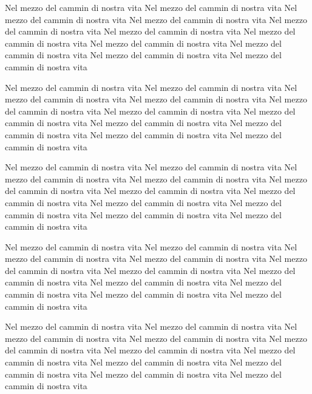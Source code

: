 \documentclass[11pt,a4paper,twoside]{book}
\begin{document}
\beginnumbering
\numberpstarttrue
{}
\pstart\label{1}%
%
%
%
Nel mezzo del cammin di nostra vita Nel mezzo del cammin di nostra vita Nel mezzo del cammin di nostra vita Nel mezzo del cammin di nostra vita Nel mezzo del cammin di nostra vita Nel mezzo del cammin di nostra vita Nel mezzo del cammin di nostra vita Nel mezzo del cammin di nostra vita Nel mezzo del cammin di nostra vita Nel mezzo del cammin di nostra vita Nel mezzo del cammin di nostra vita 
\pend

\pstart\label{2}%
%
%
Nel mezzo del cammin di nostra vita Nel mezzo del cammin di nostra vita Nel mezzo del cammin di nostra vita Nel mezzo del cammin di nostra vita Nel mezzo del cammin di nostra vita Nel mezzo del cammin di nostra vita Nel mezzo del cammin di nostra vita Nel mezzo del cammin di nostra vita Nel mezzo del cammin di nostra vita Nel mezzo del cammin di nostra vita Nel mezzo del cammin di nostra vita 
\pend

\pstart\label{3}%
%
%
Nel mezzo del cammin di nostra vita Nel mezzo del cammin di nostra vita Nel mezzo del cammin di nostra vita Nel mezzo del cammin di nostra vita Nel mezzo del cammin di nostra vita Nel mezzo del cammin di nostra vita Nel mezzo del cammin di nostra vita Nel mezzo del cammin di nostra vita Nel mezzo del cammin di nostra vita Nel mezzo del cammin di nostra vita Nel mezzo del cammin di nostra vita 
\pend

\pstart\label{4}%
%
%
Nel mezzo del cammin di nostra vita Nel mezzo del cammin di nostra vita Nel mezzo del cammin di nostra vita Nel mezzo del cammin di nostra vita Nel mezzo del cammin di nostra vita Nel mezzo del cammin di nostra vita Nel mezzo del cammin di nostra vita Nel mezzo del cammin di nostra vita Nel mezzo del cammin di nostra vita Nel mezzo del cammin di nostra vita Nel mezzo del cammin di nostra vita 
\pend

\pstart\label{5}%
%
%
Nel mezzo del cammin di nostra vita Nel mezzo del cammin di nostra vita Nel mezzo del cammin di nostra vita Nel mezzo del cammin di nostra vita Nel mezzo del cammin di nostra vita Nel mezzo del cammin di nostra vita Nel mezzo del cammin di nostra vita Nel mezzo del cammin di nostra vita Nel mezzo del cammin di nostra vita Nel mezzo del cammin di nostra vita Nel mezzo del cammin di nostra vita 
\pend
\end{document}
